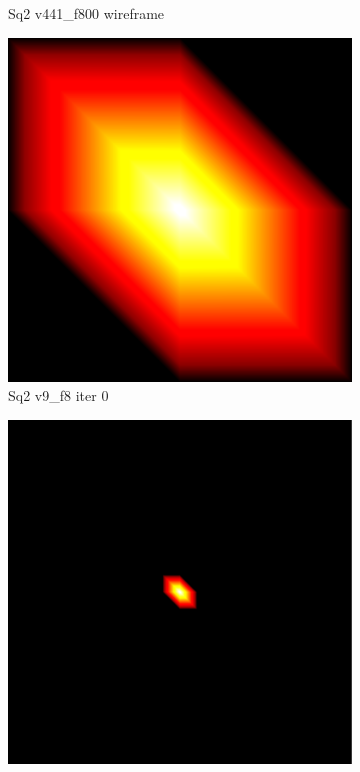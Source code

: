 \begin{figure}[ht]
{\begin{subfigure}[b]{0.48\linewidth}
		\caption{Sq2 v441\_f800 wireframe}\label{fig:sq2.b}
	\end{subfigure}

	\bigskip
	\begin{subfigure}[b]{0.48\linewidth}
		\includegraphics[width=1.0\linewidth,height=0.32\textheight,keepaspectratio]{data/synthetic_meshes/square_tesselation_2tri_Dirac_delta_1_v9_f8_funcvals_0iter_crop.png}
		\caption{Sq2 v9\_f8 iter 0}\label{fig:sq2.c}
	\end{subfigure}
	\begin{subfigure}[b]{0.48\linewidth}
		\includegraphics[width=1.0\linewidth,height=0.32\textheight,keepaspectratio]{data/synthetic_meshes/square_tessellation_2tri_Dirac_delta_10_v441_f800_funcvals_0iter.png}

\end{subfigure}}
\end{figure}
